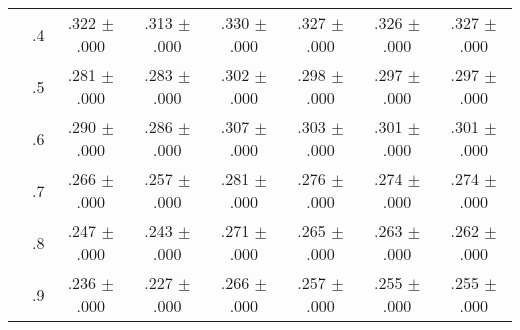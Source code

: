\begin{tabular}{cccccccc}
 & .4 & .322 $\pm$ .000 & .313 $\pm$ .000 & .330 $\pm$ .000 & .327 $\pm$ .000 & .326 $\pm$ .000 & .327 $\pm$ .000 \\
 & .5 & .281 $\pm$ .000 & .283 $\pm$ .000 & .302 $\pm$ .000 & .298 $\pm$ .000 & .297 $\pm$ .000 & .297 $\pm$ .000 \\
 & .6 & .290 $\pm$ .000 & .286 $\pm$ .000 & .307 $\pm$ .000 & .303 $\pm$ .000 & .301 $\pm$ .000 & .301 $\pm$ .000 \\
 & .7 & .266 $\pm$ .000 & .257 $\pm$ .000 & .281 $\pm$ .000 & .276 $\pm$ .000 & .274 $\pm$ .000 & .274 $\pm$ .000 \\
 & .8 & .247 $\pm$ .000 & .243 $\pm$ .000 & .271 $\pm$ .000 & .265 $\pm$ .000 & .263 $\pm$ .000 & .262 $\pm$ .000 \\
 & .9 & .236 $\pm$ .000 & .227 $\pm$ .000 & .266 $\pm$ .000 & .257 $\pm$ .000 & .255 $\pm$ .000 & .255 $\pm$ .000 \\
\bottomrule
\end{tabular}